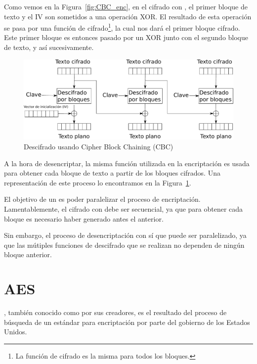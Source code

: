  Como vemos en la Figura~\ref{fig:CBC_enc}, en el cifrado con , el primer bloque de texto y el IV son sometidos a una operación XOR.
 El resultado de esta operación se pasa por una función de cifrado\footnote{La función de cifrado es la misma para todos los bloques.}, la cual nos dará el primer bloque cifrado.
 Este primer bloque es entonces pasado por un XOR junto con el segundo bloque de texto, y así sucesivamente.

 \begin{figure}[ht]
   \centering
   \includegraphics[scale=0.5]{Figures/CBC_dec}
   \decoRule
   \caption[Cipher Block Chaining (CBC) - Descifrado]{Descifrado usando Cipher Block Chaining (CBC)}
   \label{fig:CBC_dec}
 \end{figure}

 A la hora de desencriptar, la misma función utilizada en la encriptación
 es usada para obtener cada bloque de texto a partir de los bloques cifrados.
 Una representación de este proceso lo encontramos en la Figura~\ref{fig:CBC_dec}.

 El objetivo de un  es poder paralelizar el proceso de encriptación.
 Lamentablemente, el cifrado con  debe ser secuencial,
 ya que para obtener cada bloque es necesario haber generado antes el anterior.

 Sin embargo, el proceso de desencriptación con  sí que puede ser paralelizado,
 ya que las mútiples funciones de descifrado que se realizan no dependen de ningún bloque anterior. \emph{\parencite{Reference24}}


 \section{AES}

 , también conocido como  por sus creadores,
 es el resultado del proceso de búsqueda de un estándar para encriptación por parte del gobierno de los Estados Unidos.

